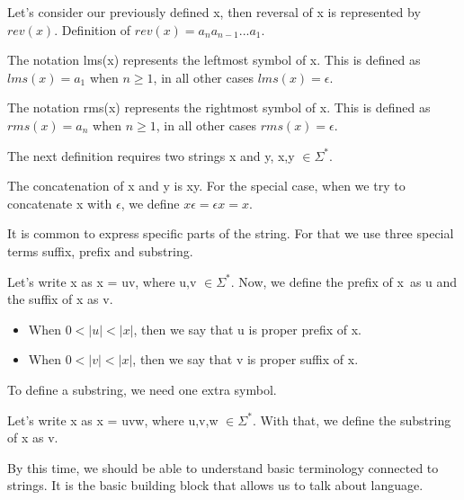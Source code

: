 \begin{definition}
\label{Def4}
Let's consider our previously defined x, then reversal of x is represented by $rev(x)$. Definition of $rev(x) = a_na_{n-1}...a_1$.
\end{definition}

\begin{definition}
\label{Def5}
The notation lms(x) represents the leftmost symbol of x. This is defined as $lms(x) = a_1$ when $n \geq 1$, in all other cases $lms(x) = \epsilon$. 
\end{definition}

\begin{definition}
\label{Def6}
The notation rms(x) represents the rightmost symbol of x. This is defined as $rms(x) = a_n$ when $n \geq 1$, in all other cases $rms(x) = \epsilon$. 
\end{definition}

The next definition requires two strings x and y, x,y $\in \Sigma^*$.

\begin{definition}
\label{Def7}
The concatenation of x and y is xy. For the special case, when we try to concatenate x with $\epsilon$, we define $x\epsilon = \epsilon x = x$.
\end{definition}

It is common to express specific parts of the string. For that we use three special terms suffix, prefix and substring.

\begin{definition}
\label{Def8}
Let's write x as x = uv, where u,v $\in \Sigma^*$. Now, we define the prefix of x~as u and the suffix of x as v.
\begin{itemize}
  \item{When $0 < |u| < |x|$, then we say that u is proper prefix of x.}
  \item{When $0 < |v| < |x|$, then we say that v is proper suffix of x.} 
\end{itemize}
\end{definition}

To define a substring, we need one extra symbol.

\begin{definition}
\label{Def9}
Let's write x as x = uvw, where u,v,w $\in \Sigma^*$. With that, we define the substring of x as v.
\end{definition}

By this time, we should be able to understand basic terminology connected to strings. It is the basic building block that allows us to talk about language.

